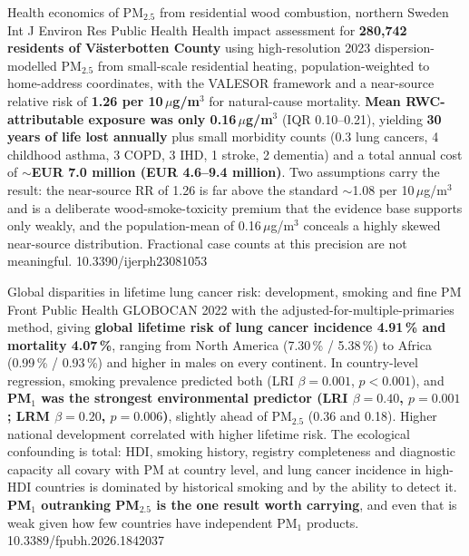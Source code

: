 \documentclass[10pt]{article}
\begin{document}
{Health economics of PM$_{2.5}$ from residential wood combustion, northern Sweden}
{Int J Environ Res Public Health}
{Health impact assessment for \textbf{280{,}742 residents of V\"asterbotten County} using
high-resolution 2023 dispersion-modelled PM$_{2.5}$ from small-scale residential heating,
population-weighted to home-address coordinates, with the VALESOR framework and a
near-source relative risk of \textbf{1.26 per 10\,$\mu$g/m$^3$} for natural-cause
mortality. \textbf{Mean RWC-attributable exposure was only 0.16\,$\mu$g/m$^3$}
(IQR 0.10--0.21), yielding \textbf{30 years of life lost annually} plus small morbidity
counts (0.3 lung cancers, 4 childhood asthma, 3 COPD, 3 IHD, 1 stroke, 2 dementia) and a
total annual cost of \textbf{$\sim$EUR 7.0 million (EUR 4.6--9.4 million)}. Two
assumptions carry the result: the near-source RR of 1.26 is far above the standard
$\sim$1.08 per 10\,$\mu$g/m$^3$ and is a deliberate wood-smoke-toxicity premium that the
evidence base supports only weakly, and the population-mean of 0.16\,$\mu$g/m$^3$ conceals
a highly skewed near-source distribution. Fractional case counts at this precision are
not meaningful.}
{10.3390/ijerph23081053}

{Global disparities in lifetime lung cancer risk: development, smoking and fine PM}
{Front Public Health}
{GLOBOCAN 2022 with the adjusted-for-multiple-primaries method, giving \textbf{global
lifetime risk of lung cancer incidence 4.91\,\% and mortality 4.07\,\%}, ranging from
North America (7.30\,\% / 5.38\,\%) to Africa (0.99\,\% / 0.93\,\%) and higher in males
on every continent. In country-level regression, smoking prevalence predicted both
(LRI $\beta = 0.001$, $p < 0.001$), and \textbf{PM$_1$ was the strongest environmental
predictor (LRI $\beta = 0.40$, $p = 0.001$; LRM $\beta = 0.20$, $p = 0.006$)}, slightly
ahead of PM$_{2.5}$ (0.36 and 0.18). Higher national development correlated with higher
lifetime risk. The ecological confounding is total: HDI, smoking history, registry
completeness and diagnostic capacity all covary with PM at country level, and lung cancer
incidence in high-HDI countries is dominated by historical smoking and by the ability to
detect it. \textbf{PM$_1$ outranking PM$_{2.5}$ is the one result worth carrying}, and
even that is weak given how few countries have independent PM$_1$ products.}
{10.3389/fpubh.2026.1842037}
\end{document}
